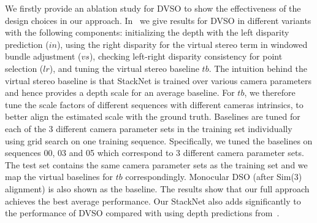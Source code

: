\documentclass[runningheads]{llncs}
\begin{document}
We firstly provide an ablation study for DVSO to show the effectiveness 
of the design choices in our approach. 
In~ we give results for DVSO in different variants with the following components:
initializing the depth with the left disparity prediction ($in$), using the right disparity for the virtual 
stereo term in windowed bundle adjustment ($vs$), checking left-right disparity consistency for point selection ($lr$),
and tuning the virtual stereo baseline $tb$.
The intuition behind the virtual stereo baseline is that StackNet is trained over various 
camera parameters and hence provides a depth scale for an average baseline.
For $tb$, we therefore tune the scale factors of different sequences with different cameras intrinsics, to better align the estimated scale with the
ground truth.
Baselines are tuned for each of the 3 different camera 
parameter sets 
in the training set individually using grid search on one training sequence. 
Specifically, we tuned the baselines on sequences 00, 03 and 05 which 
correspond to 3 different camera parameter sets. The test set 
contains the same camera parameter sets as the training 
set and we map the virtual baselines for $tb$ correspondingly. Monocular DSO 
(after Sim(3) alignment) is also 
shown as the baseline. 
The results show that our full approach achieves the 
best average performance.
Our StackNet also adds significantly to the performance of DVSO compared with 
using depth predictions from~\cite{godard2016unsupervised}.
\end{document}
